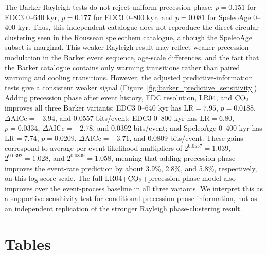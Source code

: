 \documentclass[11pt]{article}
\begin{document}
The Barker Rayleigh tests do not reject uniform precession phase: \(p=0.151\) for EDC3 0--640 kyr, \(p=0.177\) for EDC3 0--800 kyr, and \(p=0.081\) for SpeleoAge 0--400 kyr. Thus, this independent catalogue does not reproduce the direct circular clustering seen in the Rousseau speleothem catalogue, although the SpeleoAge subset is marginal. This weaker Rayleigh result may reflect weaker precession modulation in the Barker event sequence, age-scale differences, and the fact that the Barker catalogue contains only warming transitions rather than paired warming and cooling transitions. However, the adjusted predictive-information tests give a consistent weaker signal (Figure~\ref{fig:barker_predictive_sensitivity}). Adding precession phase after event history, EDC resolution, LR04, and \(\ce{CO2}\) improves all three Barker variants: EDC3 0--640 kyr has \(\mathrm{LR}=7.95\), \(p=0.0188\), \(\Delta\mathrm{AICc}=-3.94\), and 0.0557 bits/event; EDC3 0--800 kyr has \(\mathrm{LR}=6.80\), \(p=0.0334\), \(\Delta\mathrm{AICc}=-2.78\), and 0.0392 bits/event; and SpeleoAge 0--400 kyr has \(\mathrm{LR}=7.74\), \(p=0.0209\), \(\Delta\mathrm{AICc}=-3.71\), and 0.0809 bits/event. These gains correspond to average per-event likelihood multipliers of \(2^{0.0557}=1.039\), \(2^{0.0392}=1.028\), and \(2^{0.0809}=1.058\), meaning that adding precession phase improves the event-rate prediction by about 3.9\%, 2.8\%, and 5.8\%, respectively, on this log-score scale. The full LR04+\(\ce{CO2}\)+precession-phase model also improves over the event-process baseline in all three variants. We interpret this as a supportive sensitivity test for conditional precession-phase information, not as an independent replication of the stronger Rayleigh phase-clustering result.

\clearpage
\section*{Tables}
\end{document}
